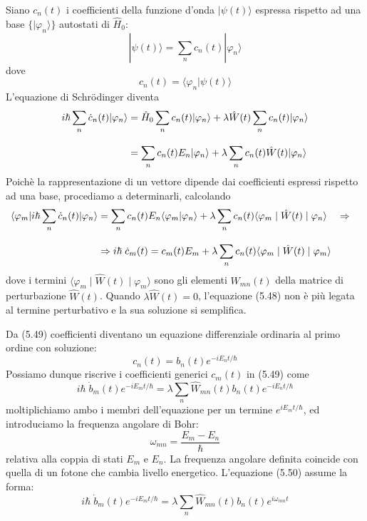 Siano $c_n (t)$ i coefficienti della funzione d'onda $|\psi(t) \rangle$ espressa rispetto ad una base $\{|\varphi_n \rangle \}$ autostati di $\hat{H}_0$:
\begin{equation*}
	|\psi(t) \rangle = \sum_{n}c_n(t)|\varphi_n \rangle
\end{equation*}
dove 
\begin{equation*}
	c_n(t) = \langle \varphi_n|\psi(t) \rangle 
\end{equation*}
L'equazione di Schr\"odinger diventa 
\begin{align}
	i \hbar \sum_{n} \dot{c}_{n}(t)|\varphi_n \rangle & = \hat{H}_0 \sum_{n}c_n(t)|\varphi_n \rangle + \lambda \hat{W}(t) \sum_{n}c_n(t)|\varphi_n \rangle \notag \\[0.3cm]
	& = \sum_{n}c_n(t)E_n|\varphi_n \rangle + \lambda \sum_{n}c_n(t) \hat{W}(t)|\varphi_n \rangle
\end{align}
Poich\`e la rappresentazione di un vettore dipende dai coefficienti espressi rispetto ad una base, procediamo a determinarli, calcolando
\begin{align}
	 \langle \varphi_m|i \hbar \sum_{n}\dot{c}_{n}(t)|\varphi_n \rangle & = \sum_{n}c_n(t)E_n\langle \varphi_m |\varphi_n \rangle + \lambda \sum_{n}c_n(t) \langle \varphi_m \mid \hat{W}(t) \mid \varphi_n \rangle \quad \Rightarrow \quad \notag \\[0.3cm]
	& \Rightarrow i \hbar \; \dot{c}_{m}(t) = c_m(t)E_m + \lambda \sum_{n}c_n(t) \langle \varphi_m \mid \hat{W}(t) \mid \varphi_m \rangle 
\end{align}
dove i termini $\langle \varphi_m \mid \hat{W}(t) \mid \varphi_m \rangle$ sono gli elementi $W_{mn}(t)$ della matrice di perturbazione $\hat{W}(t)$. Quando $\lambda \hat{W}(t) = 0$, l'equazione (5.48) non \`e pi\`u legata al termine perturbativo e la sua soluzione si semplifica. 
\newpage

Da (5.49) coefficienti diventano un equazione differenziale ordinaria al primo ordine con soluzione:
\begin{equation*}
	c_n(t) = b_n(t)e^{-iE_n t/\hbar }
\end{equation*}
Possiamo dunque riscrive i coefficienti generici $c_m(t)$ in (5.49) come
\begin{equation}
	i \hbar \; \dot{b}_m(t)e^{-iE_m t/\hbar } = \lambda \sum_{n}\hat{W}_{mn}(t)b_n(t)e^{-iE_nt/\hbar}
\end{equation}
moltiplichiamo ambo i membri dell'equazione per un termine $e^{iE_mt/\hbar}$, ed introduciamo la frequenza angolare di Bohr:
\begin{equation*}
\omega_{mn} = \frac{E_m-E_n}{\hbar}	
\end{equation*}
relativa alla coppia di stati $E_m$ e $E_n$. La frequenza angolare definita coincide con quella di un fotone che cambia livello energetico. L'equazione (5.50) assume la forma:
\begin{equation}
	i \hbar \; \dot{b}_m(t)e^{-iE_m t/\hbar } = \lambda \sum_{n}\hat{W}_{mn}(t)b_n(t)e^{i \omega_{mn}t}
\end{equation}

